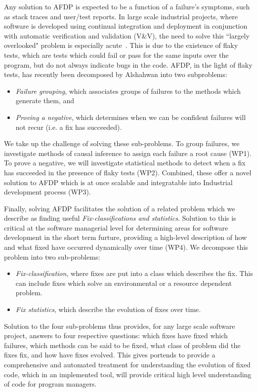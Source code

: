 Any solution to AFDP is expected to be a function of a failure's symptoms, such as stack traces and user/test reports. In large scale industrial projects, where software is developed using continual integration and deployment in conjunction with automatic verification and validation (V\&V), the need to solve this ``largely overlooked" problem is especially acute~\cite{Facebook1}. This is due to the existence of flaky tests, which are tests which could fail or pass for the same inputs over the program, but do not always indicate bugs in the code.
AFDP, in the light of flaky tests, has recently been decomposed by Alshahwan \etal  into two subproblems: 

\begin{itemize}
\item  \emph{Failure grouping}, which associates groups of failures to the methods which generate them, and 

\item \emph{Proving a negative}, which determines when we can be confident failures will not recur (i.e. a fix has succeeded). 
\end{itemize}

We take up the challenge of solving these sub-problems. To group failures, we investigate methods of causal inference to assign each failure a root cause (WP1).  To prove a negative, we will investigate statistical methods to detect when a fix has succeeded in the presence of flaky tests (WP2). Combined, these offer a novel solution to AFDP which is at once scalable and integratable into Industrial development process (WP3). 

Finally, solving AFDP facilitates the solution of a related problem which we describe as finding useful \textit{Fix-classifications and statistics}. Solution to this is critical at the software managerial level for determining areas for software development in the short term furture, providing a high-level description of how and what fixed have occurred dynamically over time (WP4).  We decompose this problem into two sub-problems:

\begin{itemize}
\item \textit{Fix-classification}, where fixes are put into a class which describes the fix. This can include fixes which solve an environmental or a resource dependent problem.

\item \textit{Fix statistics}, which describe the evolution of fixes over time.
\end{itemize}

Solution to the four sub-problems thus provides, for any large scale software project, answers to four respective questions: which fixes have fixed which failures, which methods can be said to be fixed, what class of problem did the fixes fix, and how have fixes evolved. This gives portends to provide a comprehensive and automated treatment for understanding the evolution of fixed code, which in an implemented tool, will provide critical high level understanding of code for program managers. 